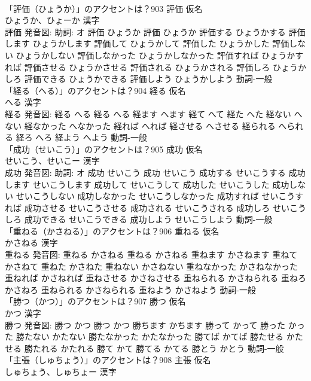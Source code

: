 \documentclass[8pt]{extreport}
\begin{document}
\begin{CJK}{UTF8}{min}
\\	「評価（ひょうか）」のアクセントは？903	評価 仮名　
\\	ひょうか、ひょーか 漢字　
\\	評価 発音図: 助詞: オ	評価 ひょうか		評価 ひょうか 評価する ひょうかする 評価します ひょうかします 評価して ひょうかして 評価した ひょうかした 評価しない ひょうかしない 評価しなかった ひょうかしなかった 評価すれば ひょうかすれば 評価させる ひょうかさせる 評価される ひょうかされる 評価しろ ひょうかしろ 評価できる ひょうかできる 評価しよう ひょうかしよう				動詞-一般 
\\	「経る（へる）」のアクセントは？904	経る 仮名　
\\	へる 漢字　
\\	経る 発音図:	経る へる		経る へる 経ます へます 経て へて 経た へた 経ない へない 経なかった へなかった 経れば へれば 経させる へさせる 経られる へられる 経ろ へろ 経よう へよう				動詞-一般 
\\	「成功（せいこう）」のアクセントは？905	成功 仮名　
\\	せいこう、せいこー 漢字　
\\	成功 発音図: 助詞: オ	成功 せいこう		成功 せいこう 成功する せいこうする 成功します せいこうします 成功して せいこうして 成功した せいこうした 成功しない せいこうしない 成功しなかった せいこうしなかった 成功すれば せいこうすれば 成功させる せいこうさせる 成功される せいこうされる 成功しろ せいこうしろ 成功できる せいこうできる 成功しよう せいこうしよう				動詞-一般 
\\	「重ねる（かさねる）」のアクセントは？906	重ねる 仮名　
\\	かさねる 漢字　
\\	重ねる 発音図:	重ねる かさねる		重ねる かさねる 重ねます かさねます 重ねて かさねて 重ねた かさねた 重ねない かさねない 重ねなかった かさねなかった 重ねれば かさねれば 重ねさせる かさねさせる 重ねられる かさねられる 重ねろ かさねろ 重ねられる かさねられる 重ねよう かさねよう				動詞-一般 
\\	「勝つ（かつ）」のアクセントは？907	勝つ 仮名　
\\	かつ 漢字　
\\	勝つ 発音図:	勝つ かつ		勝つ かつ 勝ちます かちます 勝って かって 勝った かった 勝たない かたない 勝たなかった かたなかった 勝てば かてば 勝たせる かたせる 勝たれる かたれる 勝て かて 勝てる かてる 勝とう かとう				動詞-一般 
\\	「主張（しゅちょう）」のアクセントは？908	主張 仮名　
\\	しゅちょう、しゅちょー 漢字　

\end{CJK}
\end{document}
